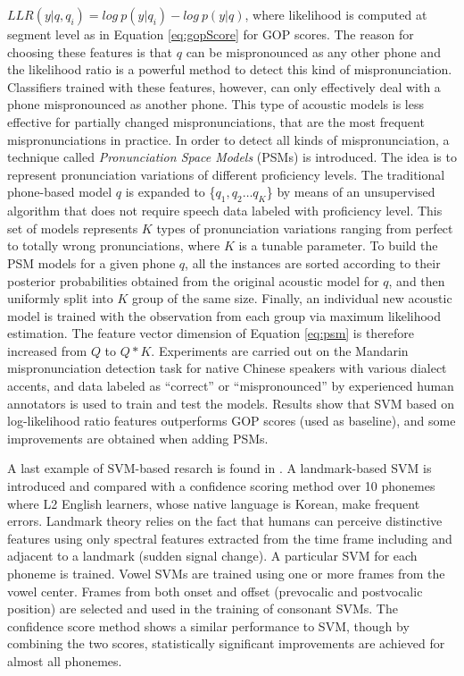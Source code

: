 $LLR(y|q,q_{i})=log \ p(y|q_{i}) - log \ p(y|q)$, where likelihood is computed at segment
level as in Equation \ref{eq:gopScore} for GOP scores. The reason for choosing these features is
that $q$ can be mispronounced as any other phone and the likelihood ratio is a powerful
method to detect this kind of mispronunciation. Classifiers trained with these features, however,
can only effectively deal with a phone mispronounced as another phone. This type of acoustic models is
less effective for partially changed mispronunciations, that are the most frequent mispronunciations
in practice. In order to detect all kinds of mispronunciation, a technique called
\textit{Pronunciation Space Models} (PSMs) is introduced. The idea is to represent pronunciation variations
of different proficiency levels. The traditional phone-based model $q$ is expanded to
\{$q_{1}, q_{2} \dotsc q_{K}$\} by means of an unsupervised algorithm that does not require
speech data labeled with proficiency level.
This set of models represents $K$ types of pronunciation variations ranging from perfect to
totally wrong pronunciations, where $K$ is a tunable parameter. To build the PSM models for a
given phone $q$, all the instances are sorted according to their
posterior probabilities obtained from the original acoustic model for $q$, and
then uniformly split into $K$ group of the same size. Finally, an individual new acoustic
model is trained with the observation from each group via maximum likelihood estimation.
The feature vector dimension of Equation
\ref{eq:psm} is therefore increased from $Q$ to $Q*K$.
Experiments are carried out on the
Mandarin mispronunciation detection task for native Chinese speakers with various dialect accents,
and data labeled as ``correct'' or ``mispronounced'' by experienced human annotators is used to train and test the models.
Results show that SVM based on log-likelihood ratio features outperforms GOP scores (used as baseline), and some
improvements are obtained when adding PSMs.

A last example of SVM-based resarch is found in \cite{landmark_svm, landmark_svm_2}.
A landmark-based SVM is introduced and compared with a confidence
scoring method over 10 phonemes where
L2 English learners, whose native language is Korean, make frequent errors.
Landmark theory relies on the fact that humans can perceive distinctive
features using only spectral features extracted from the time frame including and adjacent to
a landmark (sudden signal change). A particular SVM for each phoneme is trained. Vowel SVMs are
trained using one or more frames from the vowel center. Frames from both onset and offset
(prevocalic and postvocalic position) are selected and used in the training of consonant
SVMs. The confidence score method shows a similar performance to SVM, though by combining
the two scores, statistically significant improvements are achieved for almost all phonemes.

